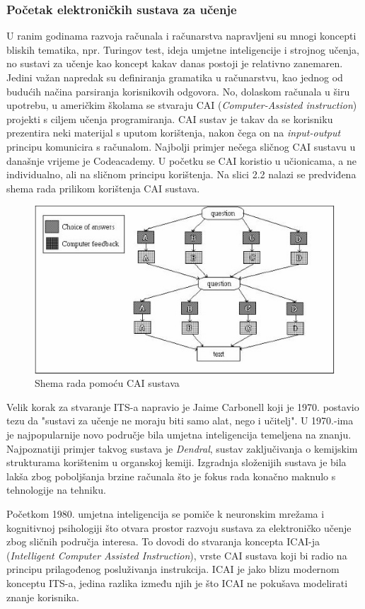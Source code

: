 \documentclass[times, utf8, zavrsni, numeric]{fer}
\begin{document}
\subsubsection{Početak elektroničkih sustava za učenje}
U ranim godinama razvoja računala i računarstva napravljeni su mnogi koncepti bliskih tematika, npr. Turingov test, ideja umjetne inteligencije i strojnog učenja, no sustavi za učenje kao koncept kakav danas postoji je relativno zanemaren. Jedini važan napredak su definiranja gramatika u računarstvu, kao jednog od budućih načina parsiranja korisnikovih odgovora. No, dolaskom računala u širu upotrebu, u američkim školama se stvaraju CAI (\textit{Computer-Assisted instruction}) projekti s ciljem učenja programiranja. CAI sustav je takav da se korisniku prezentira neki materijal s uputom korištenja, nakon čega on na \textit{input-output} principu komunicira s računalom. Najbolji primjer nečega sličnog CAI sustavu u današnje vrijeme je Codeacademy. U početku se CAI koristio u učionicama, a ne individualno, ali na sličnom principu korištenja.\cite{markurban} Na slici 2.2 nalazi se predviđena shema rada prilikom korištenja CAI sustava.

\begin{figure}[htb]
	\centering
	\includegraphics[]{img/CAI_shema.jpg}
	\caption{Shema rada pomoću CAI sustava\cite{caipic}}
	\label{fig:cai}
\end{figure}

\par
Velik korak za stvaranje ITS-a napravio je Jaime Carbonell koji je 1970. postavio tezu da "sustavi za učenje ne moraju biti samo alat, nego i učitelj".\cite{peters} U 1970.-ima je najpopularnije novo područje bila umjetna inteligencija temeljena na znanju. Najpoznatiji primjer takvog sustava je \textit{Dendral}, sustav zaključivanja o kemijskim strukturama korištenim u organskoj kemiji. Izgradnja složenijih sustava je bila lakša zbog poboljšanja brzine računala što je fokus rada konačno maknulo s tehnologije na tehniku. 
\par
Početkom 1980. umjetna inteligencija se pomiče k neuronskim mrežama i kognitivnoj psihologiji što otvara prostor razvoju sustava za elektroničko učenje zbog sličnih područja interesa. To dovodi do stvaranja koncepta ICAI-ja (\textit{Intelligent Computer Assisted Instruction}), vrste CAI sustava koji bi radio na principu prilagođenog posluživanja instrukcija. ICAI je jako blizu modernom konceptu ITS-a, jedina razlika između njih je što ICAI ne pokušava modelirati znanje korisnika.\cite{markurban}
\end{document}
